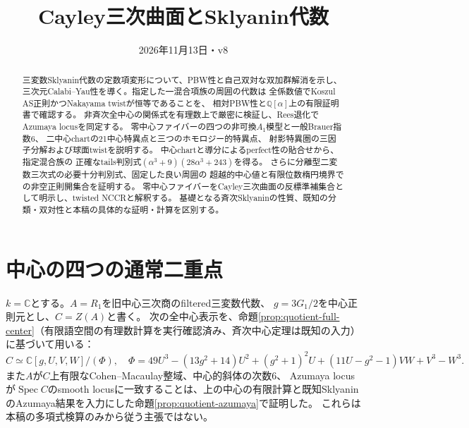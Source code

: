 \documentclass[11pt,a4paper]{ltjsarticle}
\title{Cayley三次曲面とSklyanin代数}
\date{2026年11月13日・v8}
\newcommand{\CC}{\mathbb C}
\newcommand{\Spec}{\operatorname{Spec}}
\begin{document}
\maketitle
\begin{abstract}
三変数Sklyanin代数の定数項変形について、PBW性と自己双対な双加群解消を示し、
三次元Calabi--Yau性を導く。指定した一混合項族の周囲の代数は
全係数値でKoszul AS正則かつNakayama twistが恒等であることを、
相対PBW性と$\mathbb Q[\alpha]$上の有限証明書で確認する。
非斉次全中心の関係式を有理数上で厳密に検証し、Rees退化でAzumaya locusを同定する。
零中心ファイバーの四つの非可換$A_1$模型と一般Brauer指数6、
二中心chartの21中心特異点と三つのホモロジー的特異点、
射影特異圏の三因子分解および球面twistを説明する。
中心chartと導分によるperfect性の貼合せから、指定混合族の
正確なtails判別式$(\alpha^3+9)(28\alpha^3+243)$を得る。
さらに分離型二変数三次式の必要十分判別式、固定した良い周囲の
超越的中心値と有限位数楕円境界での非空正則開集合を証明する。
零中心ファイバーをCayley三次曲面の反標準補集合として明示し、twisted NCCRと解釈する。
基礎となる斉次Sklyaninの性質、既知の分類・双対性と本稿の具体的な証明・計算を区別する。
\end{abstract}





\section{中心の四つの通常二重点}
$k=\CC$とする。$A=R_1$を旧中心三次商のfiltered三変数代数、
$g=3G_1/2$を中心正則元とし、$C=Z(A)$と書く。
次の全中心表示を、命題\ref{prop:quotient-full-center}（有限語空間の有理数計算を実行確認済み、斉次中心定理は既知の入力）に基づいて用いる：
\begin{equation}\label{eq:center}
 C\simeq
 \CC[g,U,V,W]/(\Phi),\quad
 \Phi=49U^3-(13g^2+14)U^2+(g^2+1)^2U
 +(11U-g^2-1)VW+V^3-W^3 .
\end{equation}
また$A$が$C$上有限なCohen--Macaulay整域、中心的斜体の次数6、
Azumaya locusが$\Spec C$のsmooth locusに一致することは、上の中心の有限計算と既知SklyaninのAzumaya結果を入力にした命題\ref{prop:quotient-azumaya}で証明した。
これらは本稿の多項式検算のみから従う主張ではない。
\end{document}
